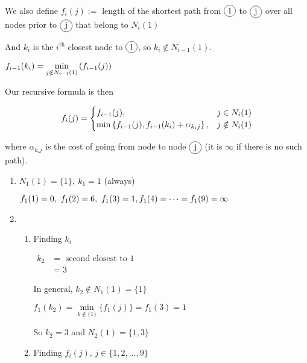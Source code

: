 \begin{prob}
\begin{sol}
        We also define $f_i(j):=$ length of the shortest path from $\tc{1}$ to $\tc{j}$ over all nodes prior to $\tc{j}$ that belong to $N_i(1)$
        
        And $k_i$ is the $i^{\text{th}}$ closest node to $\tc{1}$, so $k_i\notin N_{i-1}(1)$.
        
        $f_{i-1}(k_i)=\min\limits_{j\notin N_{i-1}(1)}\left(f_{i-1}(j)\right)$
        
        Our recursive formula is then
        
        $$f_i(j)=\begin{cases} 
        f_{i-1}(j), & j\in N_{i}(1) \\
        \min\left\{f_{i-1}(j),f_{i-1}(k_i)+\alpha_{k_i j}\right\}, & j\notin N_{i}(1)
        \end{cases}$$
        
        where $\alpha_{k_i j}$ is the cost of going from node  to node $\tc{j}$ (it is $\infty$ if there is no such path).
        
        \begin{enumerate}[label = {$\underline{i =\arabic*:}$}]
    \item 
    
    $N_1(1)=\{1\}, \ k_1=1$ (always)
    
    $f_1(1)=0,\ f_1(2)=6,\ f_1(3)=1,\\ 
    f_1(4)=\dots=f_1(9)=\infty$
    
    \item \hspace{0.1cm} \\
    
    \begin{enumerate}[start = 1, label = {\protect\trc{$\mathbf{Step \ {\arabic*}}$}}]
    \item Finding $k_i$
    
    $\begin{aligned}
        k_2 &= \text{ second closest to } 1\\
            &= 3
    \end{aligned}$
    
    In general, $k_2\notin N_1(1)=\{1\}$
    
    $f_1(k_2)=\min\limits_{k\notin\{1\}}\{f_1(j)\}=f_1(3)=1$
    
    So $k_2=3$ and $N_2(1)=\{1,3\}$
    
    \item Finding $f_i(j)$, $j\in \{1,2,\dots,9\}$
    

\end{enumerate}
\end{enumerate}
\end{sol}
\end{prob}
